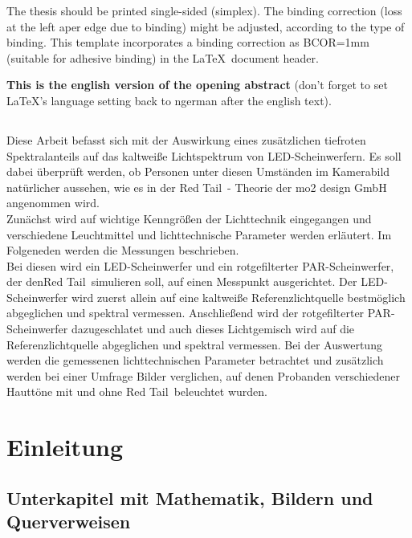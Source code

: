 The thesis should be printed single-sided (simplex). The binding correction (loss at the left aper edge due to binding) might be adjusted, according to the type of binding. This template incorporates a binding correction as BCOR=1mm (suitable for adhesive binding) in the \LaTeX\ document header.

{\bfseries This is the english version of the opening abstract} (don't forget to set \LaTeX's language setting back to ngerman after the english text). 
 
 
\section*{\centering\abstractname}

Diese Arbeit befasst sich mit der Auswirkung eines zusätzlichen tiefroten Spektralanteils auf das kaltweiße Lichtspektrum von LED-Scheinwerfern. Es soll dabei überprüft werden, ob Personen unter diesen Umständen im Kamerabild natürlicher aussehen, wie es in der \glqq Red Tail\grqq\ - Theorie der mo2 design GmbH angenommen wird.\\
Zunächst wird auf wichtige Kenngrößen der Lichttechnik eingegangen und verschiedene Leuchtmittel und lichttechnische Parameter werden erläutert. Im Folgeneden werden die Messungen beschrieben.\\
Bei diesen wird ein LED-Scheinwerfer und ein rotgefilterter PAR-Scheinwerfer, der den\glqq Red Tail\grqq\ simulieren soll, auf einen Messpunkt ausgerichtet. Der LED-Scheinwerfer wird zuerst allein auf eine kaltweiße Referenzlichtquelle bestmöglich abgeglichen und spektral vermessen. Anschließend wird der rotgefilterter PAR-Scheinwerfer dazugeschlatet und auch dieses Lichtgemisch wird auf die Referenzlichtquelle abgeglichen und spektral vermessen. 
Bei der Auswertung werden die gemessenen lichttechnischen Parameter betrachtet und zusätzlich werden bei einer Umfrage Bilder verglichen, auf denen Probanden verschiedener Hauttöne mit und ohne \glqq Red Tail\grqq\ beleuchtet wurden.





\chapter{Einleitung}

\section{Unterkapitel mit Mathematik, Bildern und Querverweisen}


